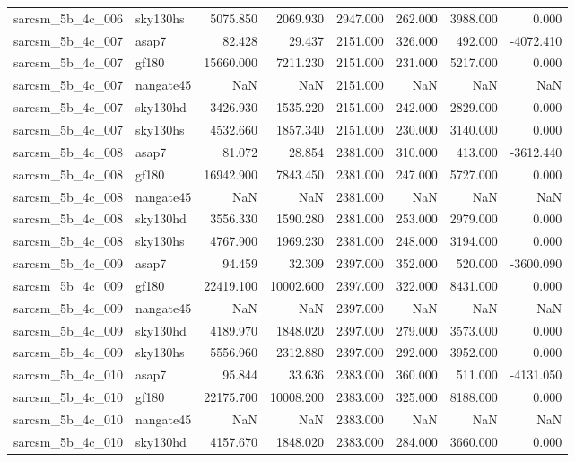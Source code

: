 \begin{tabular}{llrrrrrr}
sarcsm\_5b\_4c\_006 & sky130hs & 5075.850 & 2069.930 & 2947.000 & 262.000 & 3988.000 & 0.000 \\
sarcsm\_5b\_4c\_007 & asap7 & 82.428 & 29.437 & 2151.000 & 326.000 & 492.000 & -4072.410 \\
sarcsm\_5b\_4c\_007 & gf180 & 15660.000 & 7211.230 & 2151.000 & 231.000 & 5217.000 & 0.000 \\
sarcsm\_5b\_4c\_007 & nangate45 & NaN & NaN & 2151.000 & NaN & NaN & NaN \\
sarcsm\_5b\_4c\_007 & sky130hd & 3426.930 & 1535.220 & 2151.000 & 242.000 & 2829.000 & 0.000 \\
sarcsm\_5b\_4c\_007 & sky130hs & 4532.660 & 1857.340 & 2151.000 & 230.000 & 3140.000 & 0.000 \\
sarcsm\_5b\_4c\_008 & asap7 & 81.072 & 28.854 & 2381.000 & 310.000 & 413.000 & -3612.440 \\
sarcsm\_5b\_4c\_008 & gf180 & 16942.900 & 7843.450 & 2381.000 & 247.000 & 5727.000 & 0.000 \\
sarcsm\_5b\_4c\_008 & nangate45 & NaN & NaN & 2381.000 & NaN & NaN & NaN \\
sarcsm\_5b\_4c\_008 & sky130hd & 3556.330 & 1590.280 & 2381.000 & 253.000 & 2979.000 & 0.000 \\
sarcsm\_5b\_4c\_008 & sky130hs & 4767.900 & 1969.230 & 2381.000 & 248.000 & 3194.000 & 0.000 \\
sarcsm\_5b\_4c\_009 & asap7 & 94.459 & 32.309 & 2397.000 & 352.000 & 520.000 & -3600.090 \\
sarcsm\_5b\_4c\_009 & gf180 & 22419.100 & 10002.600 & 2397.000 & 322.000 & 8431.000 & 0.000 \\
sarcsm\_5b\_4c\_009 & nangate45 & NaN & NaN & 2397.000 & NaN & NaN & NaN \\
sarcsm\_5b\_4c\_009 & sky130hd & 4189.970 & 1848.020 & 2397.000 & 279.000 & 3573.000 & 0.000 \\
sarcsm\_5b\_4c\_009 & sky130hs & 5556.960 & 2312.880 & 2397.000 & 292.000 & 3952.000 & 0.000 \\
sarcsm\_5b\_4c\_010 & asap7 & 95.844 & 33.636 & 2383.000 & 360.000 & 511.000 & -4131.050 \\
sarcsm\_5b\_4c\_010 & gf180 & 22175.700 & 10008.200 & 2383.000 & 325.000 & 8188.000 & 0.000 \\
sarcsm\_5b\_4c\_010 & nangate45 & NaN & NaN & 2383.000 & NaN & NaN & NaN \\
sarcsm\_5b\_4c\_010 & sky130hd & 4157.670 & 1848.020 & 2383.000 & 284.000 & 3660.000 & 0.000 \\

\end{tabular}
